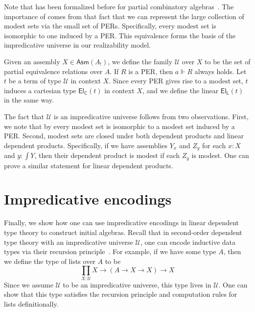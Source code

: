 \documentclass[a4paper,UKenglish,cleveref,numberwithinsect, autoref, thm-restate]{lipics-v2021}
\newcommand{\LCA}{A}
\newcommand{\LCAtoPCA}[1]{#1_!}
\newcommand{\Asm}[1]{\mathsf{Asm}(#1)}
\newcommand{\total}{\int}
\newcommand{\realize}{\Vdash}
\newcommand{\Univ}{\mathcal{U}}
\newcommand{\El}{\mathsf{El}}
\newcommand{\ElC}[1]{\El_{\mathsf{C}}\left(#1\right)}
\newcommand{\ElL}[1]{\El_{\mathsf{L}}\left(#1\right)}
\begin{document}
Note that  has been formalized before for partial combinatory algebras~\cite{chhabra:2024}.
The importance of  comes from that fact that 
we can represent the large collection of modest sets via the small set
of PERs.
Specifically,
every modest set is isomorphic to one induced by a PER.
This equivalence forms the basis of the impredicative universe in our realizability model.

\begin{example}
\label{exa:impred-universe}
Given an assembly $X \in \Asm{\LCAtoPCA{\LCA}}$,
we define the family $\Univ$ over $X$ to be the set of partial equivalence relations over $\LCA$.
If $R$ is a PER,
then $a \realize R$ always holds.
Let $t$ be a term of type $\Univ$ in context $X$.
Since every PER gives rise to a modest set,
$t$ induces a cartesian type $\ElC{t}$ in context $X$,
and we define the linear $\ElL{t}$ in the same way.

The fact that $\Univ$ is an impredicative universe
follows from two observations.
First,
we note that by  every modest set is isomorphic
to a modest set induced by a PER.
Second,
modest sets are closed under both dependent products and linear dependent products.
Specifically,
if we have assemblies $Y_x$ and $Z_y$ for each $x : X$
and $y : \total{Y}$,
then their dependent product is modest if each $Z_y$ is modest.
One can prove a similar statement for linear dependent products.
\end{example}

\section{Impredicative encodings}\label{sec:encodings}

Finally,
we show how one can use impredicative encodings in linear dependent type theory
to construct initial algebras.
Recall that in second-order dependent type theory with an impredicative universe $\Univ$,
one can encode inductive data types via their recursion principle~\cite{girard:1989}.
For example,
if we have some type $A$,
then we define the type of lists over $A$ to be
\[
\prod_{X : \Univ} X \to (A \rightarrow X \to X) \to X
\]
Since we assume $\Univ$ to be an impredicative universe,
this type lives in $\Univ$.
One can show that this type satisfies the recursion principle and computation rules for lists definitionally.
\end{document}
